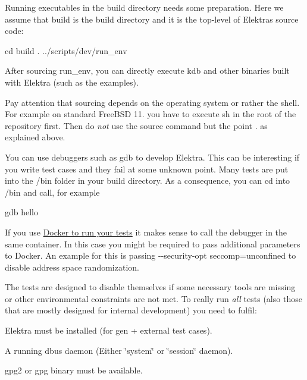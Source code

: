 Running executables in the build directory needs some preparation. Here we assume that {\ttfamily build} is the build directory and it is the top-\/level of Elektra\textquotesingle{}s source code\+:


\begin{DoxyCode}
cd build
. ../scripts/dev/run\_env
\end{DoxyCode}


After sourcing {\ttfamily run\+\_\+env}, you can directly execute {\ttfamily kdb} and other binaries built with Elektra (such as the examples).

Pay attention that sourcing depends on the operating system or rather the shell. For example on standard Free\+B\+SD 11. you have to execute {\ttfamily sh} in the root of the repository first. Then do {\itshape not} use the {\ttfamily source} command but the point {\ttfamily .} as explained above.

You can use debuggers such as {\ttfamily gdb} to develop Elektra. This can be interesting if you write test cases and they fail at some unknown point. Many tests are put into the {\ttfamily /bin} folder in your build directory. As a consequence, you can {\ttfamily cd} into {\ttfamily /bin} and call, for example


\begin{DoxyCode}
gdb hello
\end{DoxyCode}


If you use \hyperlink{doc_tutorials_run_all_tests_with_docker_md}{Docker to run your tests} it makes sense to call the debugger in the same container. In this case you might be required to pass additional parameters to Docker. An example for this is passing {\ttfamily -\/-\/security-\/opt seccomp=unconfined} to disable address space randomization.

The tests are designed to disable themselves if some necessary tools are missing or other environmental constraints are not met. To really run {\itshape all} tests (also those that are mostly designed for internal development) you need to fulfil\+:


\begin{DoxyItemize}
\item Elektra must be installed (for gen + external test cases).
\item A running dbus daemon (Either \char`\"{}system\char`\"{} or \char`\"{}session\char`\"{} daemon).
\item {\ttfamily gpg2} or {\ttfamily gpg} binary must be available.
\end{DoxyItemize}

